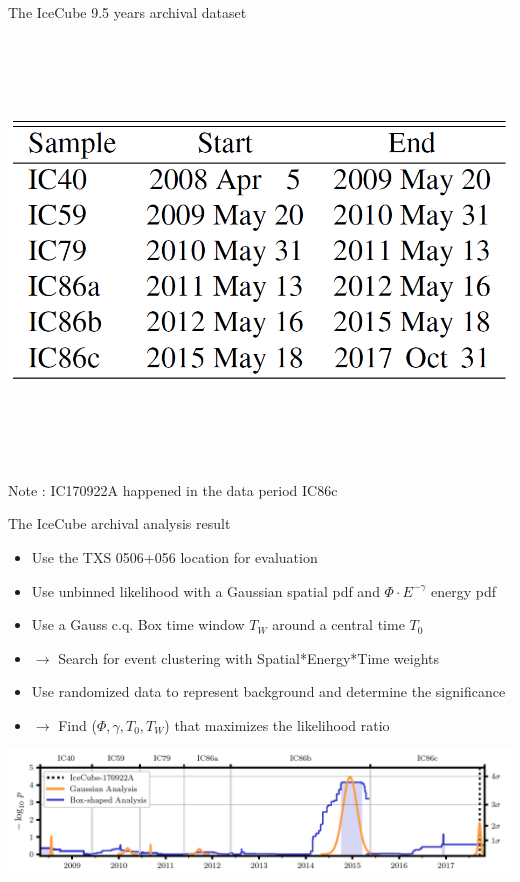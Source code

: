 \Tr
\onecolumn
\begin{center}
{\blue The IceCube 9.5 years archival dataset}\\[3mm]
\includegraphics[keepaspectratio,height=12cm]{IC-archival-dataset}\\[3mm]
{\red Note : IC170922A happened in the data period IC86c}
\end{center}

\Tr
\onecolumn
\begin{center}
{\blue The IceCube archival analysis result}
\end{center}
%
\begin{itemize}
\item Use the TXS 0506+056 location for evaluation
\item Use unbinned likelihood with a Gaussian spatial pdf and $\Phi \cdot E^{-\gamma}$ energy pdf
\item Use a Gauss c.q. Box time window $T_{W}$ around a central time $T_{0}$
\item[] $\rightarrow$ Search for event clustering with Spatial*Energy*Time weights
\item Use randomized data to represent background and determine the significance
\item[] $\rightarrow$ Find ($\Phi,\gamma,T_{0},T_{W}$) that maximizes the likelihood ratio
\end{itemize}
%
\begin{center}
\includegraphics[keepaspectratio,width=26cm]{txs-time-dependent}
\end{center}


